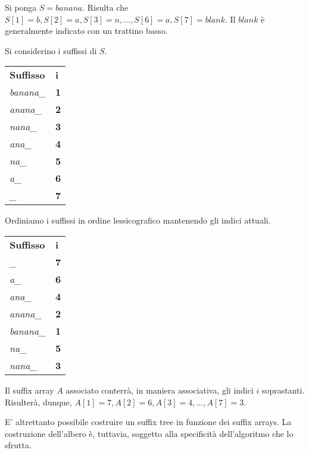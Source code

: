 \vspace{3mm}

Si ponga $S=banana$. Risulta che $S[1]=b, S[2]=a, S[3]=n, ..., S[6]=a, S[7]=blank$. Il $blank$ è generalmente indicato con un trattino basso.

\vspace{3mm}

Si considerino i suffissi di $S$.

\begin{table}[H]
\centering
\begin{tabular}{ll}
\textbf{Suffisso} & \textbf{i} \\
\textit{banana\_} & \textbf{1} \\
\textit{anana\_}  & \textbf{2} \\
\textit{nana\_}   & \textbf{3} \\
\textit{ana\_}    & \textbf{4} \\
\textit{na\_}     & \textbf{5} \\
\textit{a\_}      & \textbf{6} \\
\textit{\_}       & \textbf{7}
\end{tabular}
\end{table}

Ordiniamo i suffissi in ordine lessicografico mantenendo gli indici attuali.

\begin{table}[H]
\centering
\begin{tabular}{ll}
\textbf{Suffisso} & \textbf{i} \\
\textit{\_}       & \textbf{7} \\
\textit{a\_}      & \textbf{6} \\
\textit{ana\_}    & \textbf{4} \\
\textit{anana\_}  & \textbf{2} \\
\textit{banana\_} & \textbf{1} \\
\textit{na\_}     & \textbf{5} \\
\textit{nana\_}   & \textbf{3}
\end{tabular}
\end{table}

Il suffix array $A$ associato conterrà, in maniera associativa, gli indici $i$ soprastanti. Risulterà, dunque, $A[1]=7, A[2]=6, A[3]=4, ..., A[7]=3$.

\vspace{3mm}

E' altrettanto possibile costruire un suffix tree in funzione dei suffix arrays. La costruzione dell'albero è, tuttavia, soggetto alla specificità dell'algoritmo che lo sfrutta.

